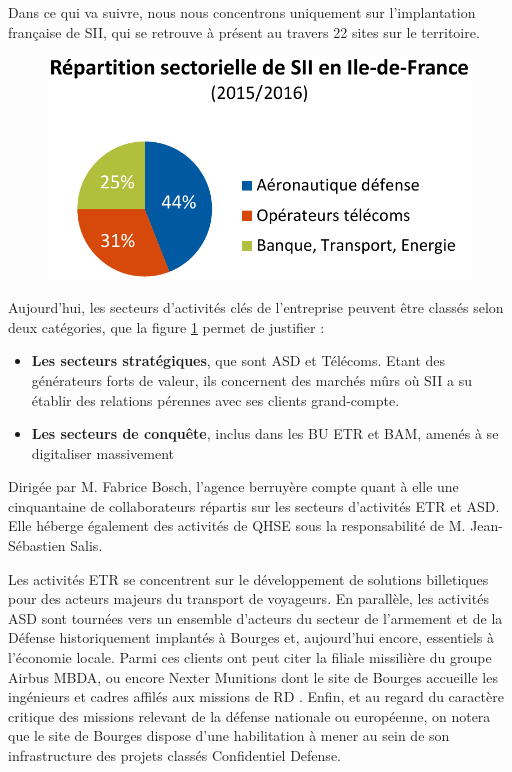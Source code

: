 Dans ce qui va suivre, nous nous concentrons uniquement sur l'implantation française de SII, qui se retrouve à présent au travers 22 sites sur le territoire.  

\begin{figure}[h]
    \centering
    \includegraphics[width=.5\linewidth]{figures/BU-IDF}
    \label{fig:Rep-sectorielle}
\end{figure}

Aujourd'hui, les secteurs d'activités clés de l'entreprise peuvent être classés selon deux catégories\cite{Bib_memento_ag_idf}, que la figure \ref{fig:Rep-sectorielle} permet de justifier : 

\begin{itemize}
  \item \textbf{Les secteurs stratégiques}, que sont \gls{ASD} et Télécoms. Etant des générateurs forts de valeur, ils concernent des marchés mûrs où SII a su établir des relations pérennes avec ses clients grand-compte. 
  \item \textbf{Les secteurs de conquête}, inclus dans les \gls{BU} \gls{ETR} et \gls{BAM}, amenés à se digitaliser massivement
\end{itemize}

Dirigée par M. Fabrice Bosch, l'agence berruyère compte quant à elle une cinquantaine de collaborateurs répartis sur les secteurs d'activités \gls{ETR} et \gls{ASD}. 
Elle héberge également des activités de \gls{QHSE} sous la responsabilité de M. Jean-Sébastien Salis.  

Les activités \gls{ETR} se concentrent sur le développement de solutions billetiques pour des acteurs majeurs du transport de voyageurs. 
En parallèle, les activités \gls{ASD} sont tournées vers un ensemble d'acteurs du secteur de l'armement et de la Défense historiquement implantés à Bourges et, aujourd'hui encore, essentiels à l'économie locale\cite{Bib_def_cher}. 
Parmi ces clients ont peut citer la filiale missilière du groupe Airbus MBDA, ou encore Nexter Munitions dont le site de Bourges accueille les ingénieurs et cadres affilés aux missions de \gls{RD} . 
Enfin, et au regard du caractère critique des missions relevant de la défense nationale ou européenne, on notera que le site de Bourges dispose d'une habilitation à mener au sein de son infrastructure des projets classés Confidentiel
Defense. 

